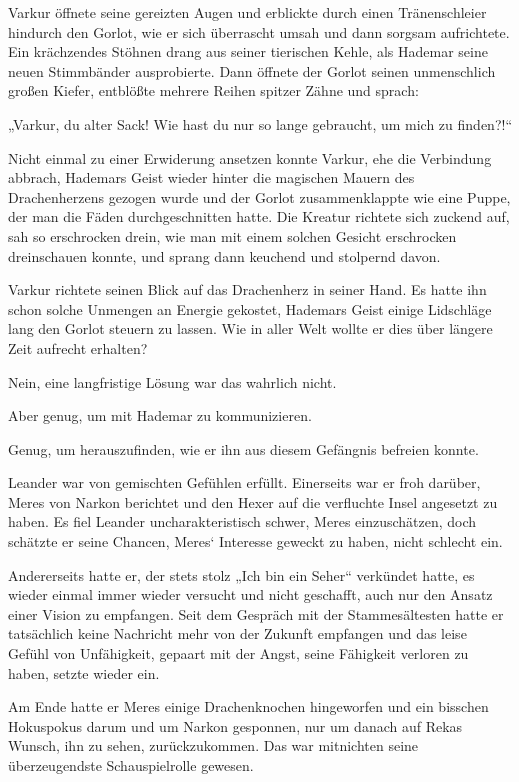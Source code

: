 Varkur öffnete seine gereizten Augen und erblickte durch einen Tränenschleier hindurch den Gorlot, wie er sich überrascht umsah und dann sorgsam aufrichtete. Ein krächzendes Stöhnen drang aus seiner tierischen Kehle, als Hademar seine neuen Stimmbänder ausprobierte. Dann öffnete der Gorlot seinen unmenschlich großen Kiefer, entblößte mehrere Reihen spitzer Zähne und sprach:

„Varkur, du alter Sack! Wie hast du nur so lange gebraucht, um mich zu finden?!“

Nicht einmal zu einer Erwiderung ansetzen konnte Varkur, ehe die Verbindung abbrach, Hademars Geist wieder hinter die magischen Mauern des Drachenherzens gezogen wurde und der Gorlot zusammenklappte wie eine Puppe, der man die Fäden durchgeschnitten hatte. Die Kreatur richtete sich zuckend auf, sah so erschrocken drein, wie man mit einem solchen Gesicht erschrocken dreinschauen konnte, und sprang dann keuchend und stolpernd davon.

Varkur richtete seinen Blick auf das Drachenherz in seiner Hand. Es hatte ihn schon solche Unmengen an Energie gekostet, Hademars Geist einige Lidschläge lang den Gorlot steuern zu lassen. Wie in aller Welt wollte er dies über längere Zeit aufrecht erhalten?

Nein, eine langfristige Lösung war das wahrlich nicht.

Aber genug, um mit Hademar zu kommunizieren.

Genug, um herauszufinden, wie er ihn aus diesem Gefängnis befreien konnte.



\trennzeichen



Leander war von gemischten Gefühlen erfüllt. Einerseits war er froh darüber, Meres von Narkon berichtet und den Hexer auf die verfluchte Insel angesetzt zu haben. Es fiel Leander uncharakteristisch schwer, Meres einzuschätzen, doch schätzte er seine Chancen, Meres‘ Interesse geweckt zu haben, nicht schlecht ein.

Andererseits hatte er, der stets stolz „Ich bin ein Seher“ verkündet hatte, es wieder einmal immer wieder versucht und nicht geschafft, auch nur den Ansatz einer Vision zu empfangen. Seit dem Gespräch mit der Stammesältesten hatte er tatsächlich keine Nachricht mehr von der Zukunft empfangen und das leise Gefühl von Unfähigkeit, gepaart mit der Angst, seine Fähigkeit verloren zu haben, setzte wieder ein.

Am Ende hatte er Meres einige Drachenknochen hingeworfen und ein bisschen Hokuspokus darum und um Narkon gesponnen, nur um danach auf Rekas Wunsch, ihn zu sehen, zurückzukommen. Das war mitnichten seine überzeugendste Schauspielrolle gewesen.

